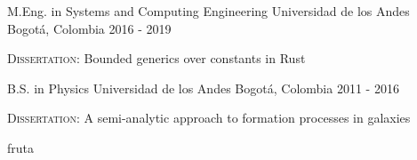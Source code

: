 

\begin{cventries}

\vspace{-1cm}
\cventry{}{}{}{}{}
\noindent
\cventry
{M.Eng. in Systems and Computing Engineering} %
{Universidad de los Andes} %
{Bogotá, Colombia} %
{2016 - 2019} %
{
    \begin{cvitems}
    \item {\textsc{Dissertation:} Bounded generics over constants in Rust}
    \end{cvitems}
}
\vspace{0.4cm}
\cventry
{B.S. in Physics} %
{Universidad de los Andes} %
{Bogotá, Colombia} %
{2011 - 2016} %
{
    \begin{cvitems}
    \item {\textsc{Dissertation:} A semi-analytic approach to formation processes in galaxies}
    \end{cvitems}
}
fruta
\vspace{-0.5cm}
\end{cventries}
